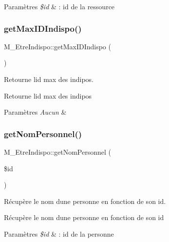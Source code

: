 \begin{DoxyParams}{Paramètres}
{\em \$id} & \+: id de la ressource \\
\hline
\end{DoxyParams}
\mbox{\label{class_m___etre_indispo_acbc7981e408765b330d104a1cd5c0881}} 
\subsubsection{\texorpdfstring{get\+Max\+I\+D\+Indispo()}{getMaxIDIndispo()}}
{\footnotesize\ttfamily M\+\_\+\+Etre\+Indispo\+::get\+Max\+I\+D\+Indispo (\begin{DoxyParamCaption}{ }\end{DoxyParamCaption})}



Retourne l\textquotesingle{}id max des indipos. 

Retourne l\textquotesingle{}id max des indipos 
\begin{DoxyParams}{Paramètres}
{\em Aucun} & \\
\hline
\end{DoxyParams}
\mbox{\label{class_m___etre_indispo_a40059d26a7f0497922c82566db3b2cbf}} 
\subsubsection{\texorpdfstring{get\+Nom\+Personnel()}{getNomPersonnel()}}
{\footnotesize\ttfamily M\+\_\+\+Etre\+Indispo\+::get\+Nom\+Personnel (\begin{DoxyParamCaption}\item[{}]{\$id }\end{DoxyParamCaption})}



Récupère le nom d\textquotesingle{}une personne en fonction de son id. 

Récupère le nom d\textquotesingle{}une personne en fonction de son id 
\begin{DoxyParams}{Paramètres}
{\em \$id} & \+: id de la personne \\
\hline
\end{DoxyParams}
\mbox{\label{class_m___etre_indispo_a8bb19557ad068f3bfec862fb0bf7e9de}} 
